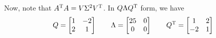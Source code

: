 \documentclass[a4paper]{article}
\begin{document}
Now, note that \(A^{\textsc{T}}A = V \Sigma^{2} V^{\textsc{T}}\). In \(Q \Lambda Q^{\textsc{T}}\) form, we have
\[
	Q =
	\begin{bmatrix}
		1 & -2 \\
		2 & 1 \\
	\end{bmatrix}
	\qquad
	\Lambda = 
	\begin{bmatrix}
		25 & 0 \\
		0 & 0 \\
	\end{bmatrix}
	\qquad
	Q^{\textsc{T}} =
	\begin{bmatrix}
		1 & 2 \\
		-2 & 1 \\
	\end{bmatrix}
\]

\end{document}
